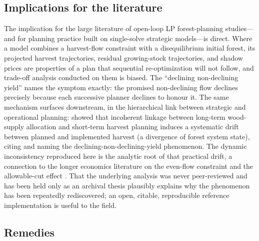 \documentclass[12pt]{article}
\begin{document}
\hypertarget{implications-for-the-literature}{%
\subsection{Implications for the literature}\label{implications-for-the-literature}}

The implication for the large literature of open-loop LP forest-planning studies---and for planning practice built on single-solve strategic models---is direct. Where a model combines a harvest-flow constraint with a disequilibrium initial forest, its projected harvest trajectories, residual growing-stock trajectories, and shadow prices are properties of a plan that sequential re-optimization will not follow, and trade-off analysis conducted on them is biased. The ``declining non-declining yield'' \citep[pp.~331--332]{gunn2007models} names the symptom exactly: the promised non-declining flow declines precisely because each successive planner declines to honour it. The same mechanism surfaces downstream, in the hierarchical link between strategic and operational planning: \citet{paradis2013risk} showed that incoherent linkage between long-term wood-supply allocation and short-term harvest planning induces a systematic drift between planned and implemented harvest (a divergence of forest system state), citing \citet{daugherty1991credibility} and naming the declining-non-declining-yield phenomenon. The dynamic inconsistency reproduced here is the analytic root of that practical drift, a connection to the longer economics literature on the even-flow constraint and the allowable-cut effect \citep{thompson1966traditional,schweitzer1972allowable,luckert1995allowable,hegan2000economic}. That the underlying analysis was never peer-reviewed and has been held only as an archival thesis plausibly explains why the phenomenon has been repeatedly rediscovered; an open, citable, reproducible reference implementation is useful to the field.

\hypertarget{remedies}{%
\subsection{Remedies}\label{remedies}}
\end{document}
